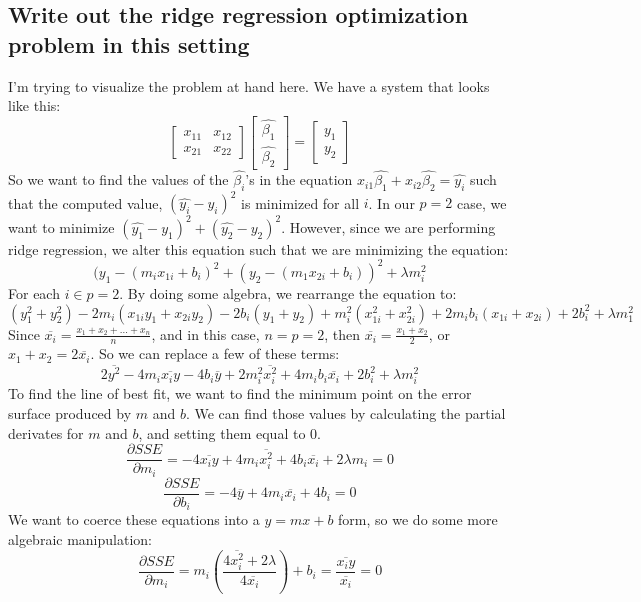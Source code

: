 \documentclass[20pt]{article} %
\begin{document}
\subsection{Write out the ridge regression optimization problem in this setting}
I'm trying to visualize the problem at hand here. We have a system that looks like this:
$$\begin{bmatrix} 
x_{11} & x_{12}\\
x_{21} & x_{22} 
\end{bmatrix}
\begin{bmatrix} 
\hat{\beta_1}\\
\hat{\beta_2}
\end{bmatrix}
=
\begin{bmatrix} 
y_1\\
y_2
\end{bmatrix}
$$
So we want to find the values of the $\hat{\beta_i}$'s in the equation $x_{i1}\hat{\beta_1} + x_{i2}\hat{\beta_2} = \hat{y_i}$ such that the computed value, $(\hat{y_i}-y_i)^{2}$ is minimized for all $i$.  In our $p = 2$ case, we want to minimize $(\hat{y_1}-y_1)^{2} + (\hat{y_2}-y_2)^{2}$.  However, since we are performing ridge regression, we alter this equation such that we are minimizing the equation:
$$(y_1 - (m_i x_{1i} + b_i)^{2} + (y_2 - (m_1 x_{2i} + b_i))^{2} + \lambda m_i^{2}$$
For each $i \in p=2$. By doing some algebra, we rearrange the equation to:
$$(y_1^{2} + y_2^{2}) - 2 m_i(x_{1i} y_1 + x_{2i} y_2) - 2 b_i(y_1+y_2) + m_i^{2}(x_{1i}^{2} + x_{2i}^{2}) + 2 m_i b_i (x_{1i} + x_{2i}) + 2b_i^{2} + \lambda m_1^{2}$$
Since $\overline{x_i} = \frac{ x_1 + x_2 + ... + x_n}{n}$, and in this case, $n = p = 2$, then $\overline{x_i} = \frac{x_1 + x_2}{2}$, or $x_1 + x_2 = 2\overline{x_i}$.  So we can replace a few of these terms:
$$2\overline{y^{2}} - 4m_i\overline{x_iy} - 4b_i\overline{y} + 2m_i^{2}\overline{x_i^{2}} + 4m_ib_i\overline{x_i} + 2b_i^{2} + \lambda m_i^{2}$$
To find the line of best fit, we want to find the minimum point on the error surface produced by $m$ and $b$.  We can find those values by calculating the partial derivates for $m$ and $b$, and setting them equal to 0.
$$\frac{\partial SSE}{\partial m_i} = -4\overline{x_iy} + 4m_i\overline{x_i^{2}} + 4b_i\overline{x_i} + 2 \lambda m_i = 0$$
$$\frac{\partial SSE}{\partial b_i} = -4\overline{y} + 4 m_i \overline{x_i} + 4b_i = 0$$
We want to coerce these equations into a $y=mx+b$ form, so we do some more algebraic manipulation:
$$\frac{\partial SSE}{\partial m_i} = m_i (\frac{4 \overline{x_i^{2}} + 2 \lambda}{4 \overline{x_i}}) + b_i = \frac{\overline{x_iy}}{\overline{x_i}} = 0$$
\end{document}
